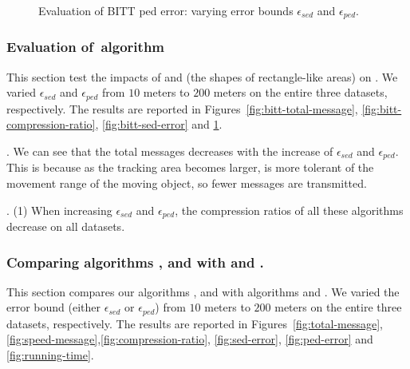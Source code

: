 {\begin{figure}[tb!]
	\vspace{-2ex}
	\caption{\small Evaluation of BITT ped error: varying error bounds $\epsilon_{sed}$ and $\epsilon_{ped}$.}
	\label{fig:bitt-ped-error}
	\vspace{-1ex}
\end{figure}



\subsubsection{Evaluation of~algorithm \bitt}
This section test the impacts of \ped and \sed (\ie the shapes of rectangle-like areas) on \bitt. We varied $\epsilon_{sed}$ and $\epsilon_{ped}$ from $10$ meters to $200$ meters on the entire three datasets, respectively. The results are reported in Figures~\ref{fig:bitt-total-message}, \ref{fig:bitt-compression-ratio}, \ref{fig:bitt-sed-error} and \ref{fig:bitt-ped-error}.

.
We can see that the total messages decreases with the increase of $\epsilon_{sed}$ and $\epsilon_{ped}$. This is because as the tracking area becomes larger, \bitt is more tolerant of the movement range of the moving object, so fewer messages are transmitted.

.
\ni (1) When increasing $\epsilon_{sed}$ and $\epsilon_{ped}$, the compression ratios of all these algorithms decrease on all datasets.








\subsubsection{Comparing algorithms \bitt, \sitt and \citt with \ldrh and \grts.}
This section compares our algorithms \citt, \sitt and \bitt with algorithms \ldrh and \grts.
We varied the error bound (either $\epsilon_{sed}$ or $\epsilon_{ped}$) from $10$ meters to $200$ meters on the entire three datasets, respectively. 
%
The results are reported in Figures~\ref{fig:total-message}, \ref{fig:speed-message},\ref{fig:compression-ratio}, \ref{fig:sed-error}, \ref{fig:ped-error} and \ref{fig:running-time}.


}
